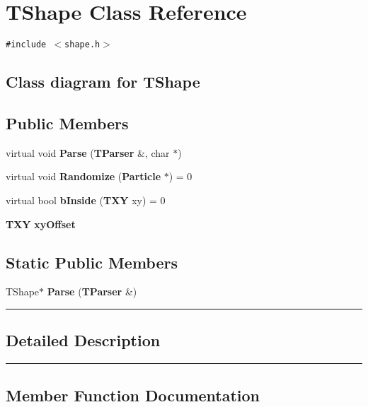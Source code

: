 \section{TShape  Class Reference}
\label{TShape}


{\tt \#include $<$shape.h$>$}

\subsection*{Class diagram for TShape}
\begin{figure}[H]
\begin{center}
\leavevmode
\setlength{\epsfysize}{1.88235cm}
\end{center}
\end{figure}
\subsection*{Public Members}
\begin{CompactItemize}
\item 
virtual void {\bf Parse} ({\bf TParser} \&, char $\ast$)
\item 
virtual void {\bf Randomize} ({\bf Particle} $\ast$) = 0
\item 
virtual bool {\bf b\-Inside} ({\bf TXY} xy) = 0
\item 
{\bf TXY} {\bf xy\-Offset}
\end{CompactItemize}
\subsection*{Static Public Members}
\begin{CompactItemize}
\item 
TShape$\ast$ {\bf Parse} ({\bf TParser} \&)
\end{CompactItemize}
\vspace{0.4cm}\hrule\vspace{0.2cm}
\subsection*{Detailed Description}
\vspace{0.4cm}\hrule\vspace{0.2cm}
\subsection*{Member Function Documentation}
\label{TShape_a0}
